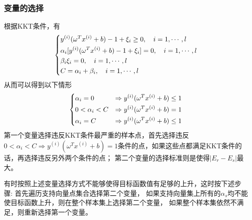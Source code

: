 \documentclass[supercite]{upcthesis}
\begin{document}
\subsubsection{变量的选择}
根据KKT条件，有
\begin{equation}
\begin{dcases}
y^{(i)}(\omega^Tx^{(i)}+b)-1+\xi_i \geq 0,\quad i=1,\cdots,l\\
\alpha_{i}[y^{(i)}(\omega^Tx^{(i)}+b)-1+\xi_i]=0,\quad i=1,\cdots,l\\
\beta_{i}\xi_i=0,\quad i=1,\cdots,l\\
C=\alpha_{i}+\beta_{i},\quad i=1,\cdots,l\\
\end{dcases}
\end{equation}
从而可以得到以下情形
\begin{equation}
\begin{dcases}
\alpha_{i}=0 & \Rightarrow y^{(i)}(\omega^Tx^{(i)}+b)\leq 1\\
0<\alpha_{i}<C & \Rightarrow y^{(i)}(\omega^Tx^{(i)}+b)=1\\
\alpha_{i}=C & \Rightarrow y^{(i)}(\omega^Tx^{(i)}+b)\leq 1
\end{dcases}
\end{equation}
第一个变量选择违反KKT条件最严重的样本点，首先选择违反$0<\alpha_{i}<C \Rightarrow y^{(i)}(\omega^Tx^{(i)}+b)=1$条件的点，如果这些点都满足KKT条件的话，再选择违反另外两个条件的点；
第二个变量的选择标准则是使得$|E_{r}-E_{s}|$最大。

有时按照上述变量选择方式不能够使得目标函数值有足够的上升，这时按下述步骤:
首先遍历支持向量点集合选择第二个变量， 
如果支持向量集上所有的$\alpha_{s}$均不能使目标函数上升，则在整个样本集上选择第二个变量， 
如果整个样本集依然不满足，则重新选择第一个变量。
\end{document}
